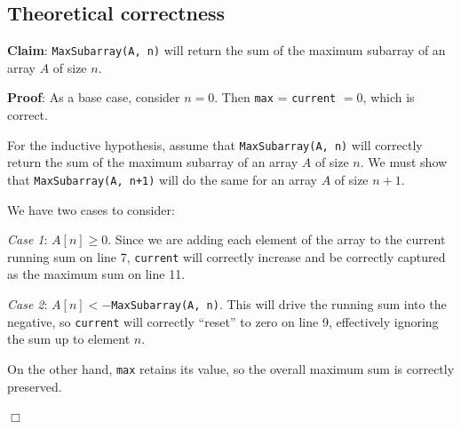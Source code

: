 \documentclass[letterpaper,10pt]{article}
\begin{document}
\begin{samepage}
	\section{Theoretical correctness}
		{\bf Claim}: {\tt MaxSubarray(A, n)} will return the sum of the maximum subarray of an array $A$ of size $n$.

		{\bf Proof}: As a base case, consider $n=0$. Then {\tt max} = {\tt current} $= 0$, which is correct.

		For the inductive hypothesis, assume that {\tt MaxSubarray(A, n)} will correctly return the sum of the maximum subarray of an array $A$ of size $n$. We must show that {\tt MaxSubarray(A, n+1)} will do the same for an array $A$ of size $n+1$.

		We have two cases to consider:

		{\it Case 1}: $A[n] \geq 0$. Since we are adding each element of the array to the current running sum on line 7, {\tt current} will correctly increase and be correctly captured as the maximum sum on line 11.

		{\it Case 2}: $A[n] < -${\tt MaxSubarray(A, n)}. This will drive the running sum into the negative, so {\tt current} will correctly ``reset'' to zero on line 9, effectively ignoring the sum up to element $n$. 

		On the other hand, {\tt max} retains its value, so the overall maximum sum is correctly preserved.

		\begin{center}
		$\Box$
		\end{center}

\end{samepage}
\end{document}
